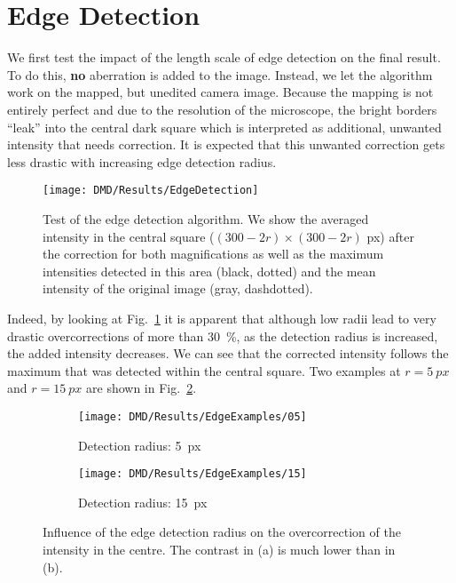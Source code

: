 \section{Edge Detection}
\label{sec:results_edgedetection}
We first test the impact of the length scale of edge detection on the final result. To do this, \textbf{no} aberration is added to the image. Instead, we let the algorithm work on the mapped, but unedited camera image. Because the mapping is not entirely perfect and due to the resolution of the microscope, the bright borders \enquote{leak} into the central dark square which is interpreted as additional, unwanted intensity that needs correction. It is expected that this unwanted correction gets less drastic with increasing edge detection radius.
\begin{figure}[htbp]
    \centering
    \texttt{[image: DMD/Results/EdgeDetection]}
    \caption[Test of the edge detection algorithm]{Test of the edge detection algorithm. We show the averaged intensity in the central square ($(300 - 2r)\times (300-2r)$ px) after the correction for both magnifications as well as the maximum intensities detected in this area (black, dotted) and the mean intensity of the original image (gray, dashdotted).}
    \label{fig:dmd_results_edgedetection}
\end{figure}
Indeed, by looking at Fig.~\ref{fig:dmd_results_edgedetection} it is apparent that although low radii lead to very drastic overcorrections of more than \SI{30}{\percent}, as the detection radius is increased, the added intensity decreases. We can see that the corrected intensity follows the maximum that was detected within the central square. Two examples at $r=\SI{5}{px}$ and $r=\SI{15}{px}$ are shown in Fig.~\ref{fig:edge_detection_test_example}.
\begin{figure}[htbp]
    \centering
    \begin{subfigure}[t]{0.43\textwidth}
        \centering
        \texttt{[image: DMD/Results/EdgeExamples/05]}
        \caption{Detection radius: \SI{5}{px}}
    \end{subfigure}
    \begin{subfigure}[t]{0.43\textwidth}
        \centering
        \texttt{[image: DMD/Results/EdgeExamples/15]}
        \caption{Detection radius: \SI{15}{px}}
    \end{subfigure}
    \caption[Influence of the edge detection radius on the overcorrection of the intensity in the centre]{Influence of the edge detection radius on the overcorrection of the intensity in the centre. The contrast in (a) is much lower than in (b).}
    \label{fig:edge_detection_test_example}
\end{figure}
\iffalse
